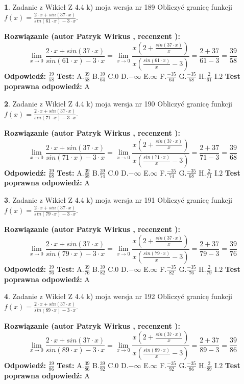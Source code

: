 \documentclass[12pt, a4paper]{article}
\theoremstyle{definition} %
\newtheorem{zad}{}
\newcommand{\zadStart}[1]{\begin{zad}#1\newline}
\newcommand{\zadStop}{\end{zad}}
\newcommand{\rozwStart}[2]{\noindent \textbf{Rozwiązanie (autor #1 , recenzent #2): }\newline}
\newcommand{\rozwStop}{\newline}
\newcommand{\odpStart}{\noindent \textbf{Odpowiedź:}\newline}
\newcommand{\odpStop}{\newline}
\newcommand{\testStart}{\noindent \textbf{Test:}\newline}
\newcommand{\testStop}{\newline}
\newcommand{\kluczStart}{\noindent \textbf{Test poprawna odpowiedź:}\newline}
\newcommand{\kluczStop}{\newline}
\begin{document}
\zadStart{Zadanie z Wikieł Z 4.4 k) moja wersja nr 189}
Obliczyć granicę funkcji $f(x)=\frac{2\cdot x +sin(37\cdot x)}{sin(61\cdot x) -3\cdot x}$.
\zadStop
\rozwStart{Patryk Wirkus}{}
$$\lim\limits_{x\to 0}\frac{2\cdot x +sin(37\cdot x)}{sin(61\cdot x) -3\cdot x}
=\lim\limits_{x\to 0}\frac{x(2+\frac{sin(37\cdot x)}{x})}{x(\frac{sin(61\cdot x)}{x}-3)}
=\frac{2+37}{61-3} = \frac{39}{58}$$
\rozwStop
\odpStart
$\frac{39}{58}$
\odpStop
\testStart
A.$\frac{39}{58}$
B.$\frac{39}{64}$
C.$0$
D.$-\infty$
E.$\infty$
F.$\frac{-35}{64}$
G.$\frac{-35}{58}$
H.$\frac{2}{61}$
I.$2$
\testStop
\kluczStart
A
\kluczStop



\zadStart{Zadanie z Wikieł Z 4.4 k) moja wersja nr 190}
Obliczyć granicę funkcji $f(x)=\frac{2\cdot x +sin(37\cdot x)}{sin(71\cdot x) -3\cdot x}$.
\zadStop
\rozwStart{Patryk Wirkus}{}
$$\lim\limits_{x\to 0}\frac{2\cdot x +sin(37\cdot x)}{sin(71\cdot x) -3\cdot x}
=\lim\limits_{x\to 0}\frac{x(2+\frac{sin(37\cdot x)}{x})}{x(\frac{sin(71\cdot x)}{x}-3)}
=\frac{2+37}{71-3} = \frac{39}{68}$$
\rozwStop
\odpStart
$\frac{39}{68}$
\odpStop
\testStart
A.$\frac{39}{68}$
B.$\frac{39}{74}$
C.$0$
D.$-\infty$
E.$\infty$
F.$\frac{-35}{74}$
G.$\frac{-35}{68}$
H.$\frac{2}{71}$
I.$2$
\testStop
\kluczStart
A
\kluczStop



\zadStart{Zadanie z Wikieł Z 4.4 k) moja wersja nr 191}
Obliczyć granicę funkcji $f(x)=\frac{2\cdot x +sin(37\cdot x)}{sin(79\cdot x) -3\cdot x}$.
\zadStop
\rozwStart{Patryk Wirkus}{}
$$\lim\limits_{x\to 0}\frac{2\cdot x +sin(37\cdot x)}{sin(79\cdot x) -3\cdot x}
=\lim\limits_{x\to 0}\frac{x(2+\frac{sin(37\cdot x)}{x})}{x(\frac{sin(79\cdot x)}{x}-3)}
=\frac{2+37}{79-3} = \frac{39}{76}$$
\rozwStop
\odpStart
$\frac{39}{76}$
\odpStop
\testStart
A.$\frac{39}{76}$
B.$\frac{39}{82}$
C.$0$
D.$-\infty$
E.$\infty$
F.$\frac{-35}{82}$
G.$\frac{-35}{76}$
H.$\frac{2}{79}$
I.$2$
\testStop
\kluczStart
A
\kluczStop



\zadStart{Zadanie z Wikieł Z 4.4 k) moja wersja nr 192}
Obliczyć granicę funkcji $f(x)=\frac{2\cdot x +sin(37\cdot x)}{sin(89\cdot x) -3\cdot x}$.
\zadStop
\rozwStart{Patryk Wirkus}{}
$$\lim\limits_{x\to 0}\frac{2\cdot x +sin(37\cdot x)}{sin(89\cdot x) -3\cdot x}
=\lim\limits_{x\to 0}\frac{x(2+\frac{sin(37\cdot x)}{x})}{x(\frac{sin(89\cdot x)}{x}-3)}
=\frac{2+37}{89-3} = \frac{39}{86}$$
\rozwStop
\odpStart
$\frac{39}{86}$
\odpStop
\testStart
A.$\frac{39}{86}$
B.$\frac{39}{92}$
C.$0$
D.$-\infty$
E.$\infty$
F.$\frac{-35}{92}$
G.$\frac{-35}{86}$
H.$\frac{2}{89}$
I.$2$
\testStop
\kluczStart
A
\kluczStop
\end{document}
